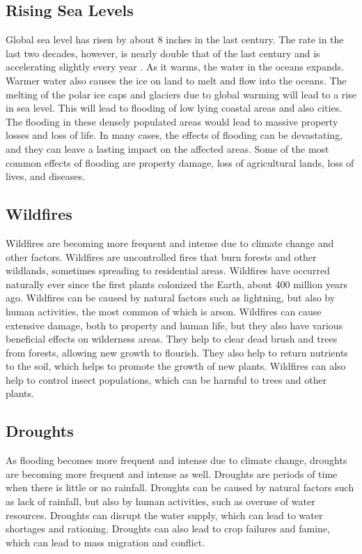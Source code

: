 \documentclass{article}
\begin{document}
\subsection{Rising Sea Levels}
Global sea level has risen by about 8 inches in the last century. The rate in
the last two decades, however, is nearly double that of the last century and is
accelerating slightly every year \cite{Lindsey}. As it warms, the water in the
oceans expands. Warmer water also causes the ice on land to melt and flow into
the oceans. The melting of the polar ice caps and glaciers due to global
warming will lead to a rise in sea level. This will lead to flooding of low
lying coastal areas and also cities. The flooding in these densely populated
areas would lead to massive property losses and loss of life. In many cases,
the effects of flooding can be devastating, and they can leave a lasting impact
on the affected areas. Some of the most common effects of flooding are property
damage, loss of agricultural lands, loss of lives, and diseases.

\subsection{Wildfires}
Wildfires are becoming more frequent and intense due to climate change and
other factors. Wildfires are uncontrolled fires that burn forests and other
wildlands, sometimes spreading to residential areas. Wildfires have occurred
naturally ever since the first plants colonized the Earth, about 400 million
years ago. Wildfires can be caused by natural factors such as lightning, but
also by human activities, the most common of which is arson. Wildfires can
cause extensive damage, both to property and human life, but they also have
various beneficial effects on wilderness areas. They help to clear dead brush
and trees from forests, allowing new growth to flourish. They also help to
return nutrients to the soil, which helps to promote the growth of new plants.
Wildfires can also help to control insect populations, which can be harmful to
trees and other plants.

\subsection{Droughts}
As flooding becomes more frequent and intense due to climate change, droughts
are becoming more frequent and intense as well. Droughts are periods of time
when there is little or no rainfall. Droughts can be caused by natural factors
such as lack of rainfall, but also by human activities, such as overuse of
water resources. Droughts can disrupt the water supply, which can lead to water
shortages and rationing. Droughts can also lead to crop failures and famine,
which can lead to mass migration and conflict.
\end{document}
